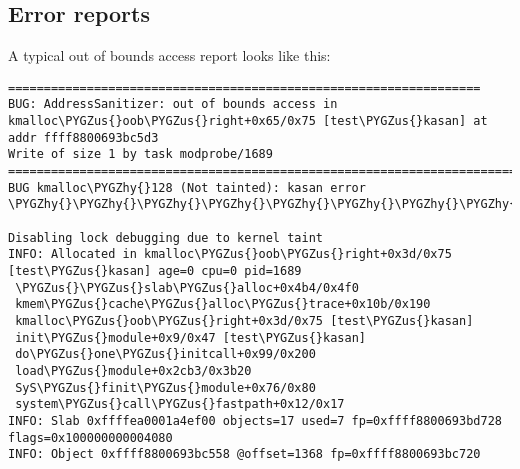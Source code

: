 \documentclass[a4paper,8pt,english]{sphinxmanual}
\def\PYGZus{\char`\_}
\def\PYGZhy{\char`\-}
\begin{document}
\subsection{Error reports}
\label{dev-tools/kasan:error-reports}
A typical out of bounds access report looks like this:

\begin{Verbatim}[commandchars=\\\{\}]
==================================================================
BUG: AddressSanitizer: out of bounds access in kmalloc\PYGZus{}oob\PYGZus{}right+0x65/0x75 [test\PYGZus{}kasan] at addr ffff8800693bc5d3
Write of size 1 by task modprobe/1689
=============================================================================
BUG kmalloc\PYGZhy{}128 (Not tainted): kasan error
\PYGZhy{}\PYGZhy{}\PYGZhy{}\PYGZhy{}\PYGZhy{}\PYGZhy{}\PYGZhy{}\PYGZhy{}\PYGZhy{}\PYGZhy{}\PYGZhy{}\PYGZhy{}\PYGZhy{}\PYGZhy{}\PYGZhy{}\PYGZhy{}\PYGZhy{}\PYGZhy{}\PYGZhy{}\PYGZhy{}\PYGZhy{}\PYGZhy{}\PYGZhy{}\PYGZhy{}\PYGZhy{}\PYGZhy{}\PYGZhy{}\PYGZhy{}\PYGZhy{}\PYGZhy{}\PYGZhy{}\PYGZhy{}\PYGZhy{}\PYGZhy{}\PYGZhy{}\PYGZhy{}\PYGZhy{}\PYGZhy{}\PYGZhy{}\PYGZhy{}\PYGZhy{}\PYGZhy{}\PYGZhy{}\PYGZhy{}\PYGZhy{}\PYGZhy{}\PYGZhy{}\PYGZhy{}\PYGZhy{}\PYGZhy{}\PYGZhy{}\PYGZhy{}\PYGZhy{}\PYGZhy{}\PYGZhy{}\PYGZhy{}\PYGZhy{}\PYGZhy{}\PYGZhy{}\PYGZhy{}\PYGZhy{}\PYGZhy{}\PYGZhy{}\PYGZhy{}\PYGZhy{}\PYGZhy{}\PYGZhy{}\PYGZhy{}\PYGZhy{}\PYGZhy{}\PYGZhy{}\PYGZhy{}\PYGZhy{}\PYGZhy{}\PYGZhy{}\PYGZhy{}\PYGZhy{}

Disabling lock debugging due to kernel taint
INFO: Allocated in kmalloc\PYGZus{}oob\PYGZus{}right+0x3d/0x75 [test\PYGZus{}kasan] age=0 cpu=0 pid=1689
 \PYGZus{}\PYGZus{}slab\PYGZus{}alloc+0x4b4/0x4f0
 kmem\PYGZus{}cache\PYGZus{}alloc\PYGZus{}trace+0x10b/0x190
 kmalloc\PYGZus{}oob\PYGZus{}right+0x3d/0x75 [test\PYGZus{}kasan]
 init\PYGZus{}module+0x9/0x47 [test\PYGZus{}kasan]
 do\PYGZus{}one\PYGZus{}initcall+0x99/0x200
 load\PYGZus{}module+0x2cb3/0x3b20
 SyS\PYGZus{}finit\PYGZus{}module+0x76/0x80
 system\PYGZus{}call\PYGZus{}fastpath+0x12/0x17
INFO: Slab 0xffffea0001a4ef00 objects=17 used=7 fp=0xffff8800693bd728 flags=0x100000000004080
INFO: Object 0xffff8800693bc558 @offset=1368 fp=0xffff8800693bc720


\end{Verbatim}
\end{document}
